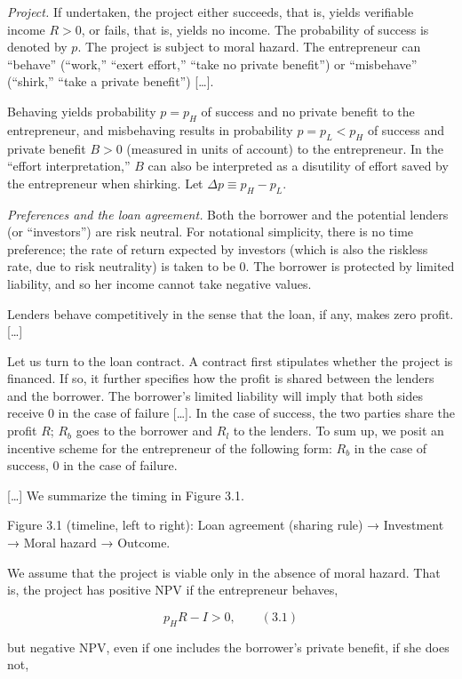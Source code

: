 \documentclass[11pt,a4paper]{article}
\begin{document}
\emph{Project.} If undertaken, the project either succeeds, that is, yields verifiable income
\(R > 0\), or fails, that is, yields no income. The probability of success is denoted by \(p\). The
project is subject to moral hazard. The entrepreneur can ``behave'' (``work,'' ``exert effort,''
``take no private benefit'') or ``misbehave'' (``shirk,'' ``take a private benefit'') {[}\ldots{]}.

Behaving yields probability \(p = p_H\) of success and no private benefit to the entrepreneur, and
misbehaving results in probability \(p = p_L < p_H\) of success and private benefit \(B > 0\)
(measured in units of account) to the entrepreneur. In the ``effort interpretation,'' \(B\) can also
be interpreted as a disutility of effort saved by the entrepreneur when shirking. Let
\(\Delta p \equiv p_H - p_L\).

\emph{Preferences and the loan agreement.} Both the borrower and the potential lenders (or
``investors'') are risk neutral. For notational simplicity, there is no time preference; the rate of
return expected by investors (which is also the riskless rate, due to risk neutrality) is taken to
be 0. The borrower is protected by limited liability, and so her income cannot take negative values.

Lenders behave competitively in the sense that the loan, if any, makes zero profit. {[}\ldots{]}

Let us turn to the loan contract. A contract first stipulates whether the project is financed. If
so, it further specifies how the profit is shared between the lenders and the borrower. The
borrower's limited liability will imply that both sides receive 0 in the case of failure
{[}\ldots{]}. In the case of success, the two parties share the profit \(R\); \(R_b\) goes to the
borrower and \(R_l\) to the lenders. To sum up, we posit an incentive scheme for the entrepreneur of
the following form: \(R_b\) in the case of success, 0 in the case of failure.

{[}\ldots{]} We summarize the timing in Figure 3.1.

Figure 3.1 (timeline, left to right): Loan agreement (sharing rule) → Investment → Moral hazard →
Outcome.

We assume that the project is viable only in the absence of moral hazard. That is, the project has
positive NPV if the entrepreneur behaves,

\[p_H R - I > 0, \qquad (3.1)\]

but negative NPV, even if one includes the borrower's private benefit, if she does not,
\end{document}
